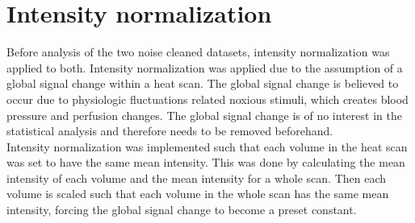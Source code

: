 \section{Intensity normalization}

Before analysis of the two noise cleaned datasets, intensity normalization was applied to both. Intensity normalization was applied due to the assumption of a global signal change within a heat scan. The global signal change is believed to occur due to physiologic fluctuations related noxious stimuli, which creates blood pressure and perfusion changes. The global signal change is of no interest in the statistical analysis and therefore needs to be removed beforehand. \cite{Macey2004} \\
Intensity normalization was implemented such that each volume in the heat scan was set to have the same mean intensity. This was done by calculating the mean intensity of each volume and the mean intensity for a whole scan. Then each volume is scaled such that each volume in the whole scan has the same mean intensity, forcing the global signal change to become a preset constant.  